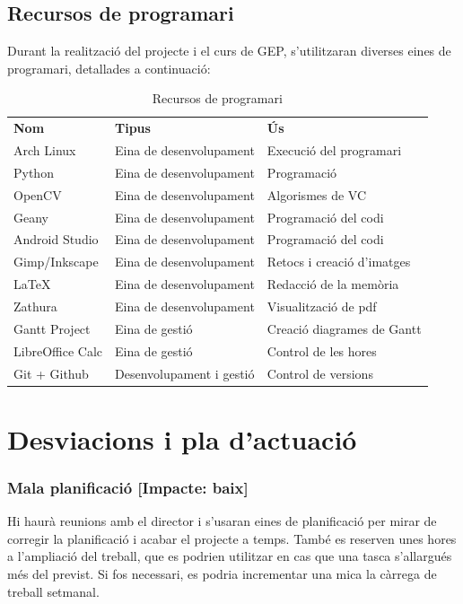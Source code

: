 	\subsection{Recursos de programari}
	Durant la realització del projecte i el curs de GEP, s'utilitzaran diverses eines de programari, detallades a continuació:\\
	\begin{table}[H]
		\begin{center}
			\begin{tabular}{l !{\vrule width -1pt}p{5cm} !{\vrule width -1pt}p{5cm}}
			\textbf{Nom} & \textbf{Tipus} & \textbf{Ús} \\
			Arch Linux & Eina de desenvolupament & Execució del programari \\
			Python & Eina de desenvolupament & Programació \\
			OpenCV & Eina de desenvolupament & Algorismes de VC \\
			Geany & Eina de desenvolupament & Programació del codi \\
			Android Studio & Eina de desenvolupament & Programació del codi \\
			Gimp/Inkscape & Eina de desenvolupament & Retocs i creació d'imatges \\
			\LaTeX & Eina de desenvolupament & Redacció de la memòria \\
			Zathura & Eina de desenvolupament & Visualització de pdf \\
			Gantt Project & Eina de gestió & Creació diagrames de Gantt \\
			LibreOffice Calc & Eina de gestió & Control de les hores \\
			Git + Github & Desenvolupament i gestió & Control de versions \\
			\end{tabular}
		\end{center}
		\caption{Recursos de programari}
		\label{table:programari}
	\end{table}
	
\section{Desviacions i pla d'actuació}
	\subsubsection{Mala planificació [Impacte: baix]}
		Hi haurà reunions amb el director i s'usaran eines de planificació per mirar de corregir la planificació i acabar el projecte a temps. També es reserven unes hores a l'ampliació del treball,
		que es podrien utilitzar en cas que una tasca s'allargués més del previst. Si fos necessari, es podria incrementar una mica la càrrega de treball setmanal.
